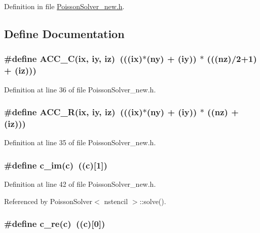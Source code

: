 Definition in file \hyperlink{PoissonSolver__new_8h_source}{PoissonSolver\_\-new.h}.



\subsection{Define Documentation}
\subsubsection[{ACC\_\-C}]{\setlength{\rightskip}{0pt plus 5cm}\#define ACC\_\-C(ix, \/  iy, \/  iz)~(((ix)$\ast$(ny) + (iy)) $\ast$ (((nz)/2+1) + (iz)))}\label{PoissonSolver__new_8h_aa0ec3c1fa56accaf6945ccf59d19ec4a}


Definition at line 36 of file PoissonSolver\_\-new.h.

\subsubsection[{ACC\_\-R}]{\setlength{\rightskip}{0pt plus 5cm}\#define ACC\_\-R(ix, \/  iy, \/  iz)~(((ix)$\ast$(ny) + (iy)) $\ast$ ((nz) + (iz)))}\label{PoissonSolver__new_8h_a2893f2854bb6eb4f81510181ef7da98d}


Definition at line 35 of file PoissonSolver\_\-new.h.

\subsubsection[{c\_\-im}]{\setlength{\rightskip}{0pt plus 5cm}\#define c\_\-im(c)~((c)\mbox{[}1\mbox{]})}\label{PoissonSolver__new_8h_a9a1e7710dc40249339b87ca5321cdb9a}


Definition at line 42 of file PoissonSolver\_\-new.h.



Referenced by PoissonSolver$<$ nstencil $>$::solve().

\subsubsection[{c\_\-re}]{\setlength{\rightskip}{0pt plus 5cm}\#define c\_\-re(c)~((c)\mbox{[}0\mbox{]})}\label{PoissonSolver__new_8h_a2dd4d4bcc83b191ea626047687be5d08}


